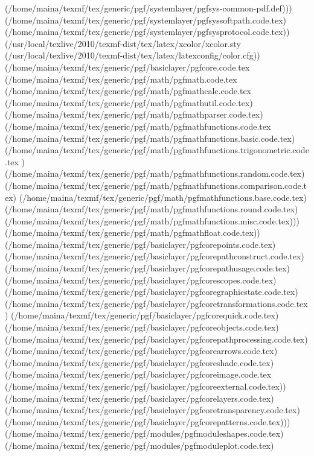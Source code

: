 (/home/maina/texmf/tex/generic/pgf/systemlayer/pgfsys-common-pdf.def)))
(/home/maina/texmf/tex/generic/pgf/systemlayer/pgfsyssoftpath.code.tex)
(/home/maina/texmf/tex/generic/pgf/systemlayer/pgfsysprotocol.code.tex))
(/usr/local/texlive/2010/texmf-dist/tex/latex/xcolor/xcolor.sty
(/usr/local/texlive/2010/texmf-dist/tex/latex/latexconfig/color.cfg))
(/home/maina/texmf/tex/generic/pgf/basiclayer/pgfcore.code.tex
(/home/maina/texmf/tex/generic/pgf/math/pgfmath.code.tex
(/home/maina/texmf/tex/generic/pgf/math/pgfmathcalc.code.tex
(/home/maina/texmf/tex/generic/pgf/math/pgfmathutil.code.tex)
(/home/maina/texmf/tex/generic/pgf/math/pgfmathparser.code.tex)
(/home/maina/texmf/tex/generic/pgf/math/pgfmathfunctions.code.tex
(/home/maina/texmf/tex/generic/pgf/math/pgfmathfunctions.basic.code.tex)
(/home/maina/texmf/tex/generic/pgf/math/pgfmathfunctions.trigonometric.code.tex
) (/home/maina/texmf/tex/generic/pgf/math/pgfmathfunctions.random.code.tex)
(/home/maina/texmf/tex/generic/pgf/math/pgfmathfunctions.comparison.code.tex)
(/home/maina/texmf/tex/generic/pgf/math/pgfmathfunctions.base.code.tex)
(/home/maina/texmf/tex/generic/pgf/math/pgfmathfunctions.round.code.tex)
(/home/maina/texmf/tex/generic/pgf/math/pgfmathfunctions.misc.code.tex)))
(/home/maina/texmf/tex/generic/pgf/math/pgfmathfloat.code.tex))
(/home/maina/texmf/tex/generic/pgf/basiclayer/pgfcorepoints.code.tex)
(/home/maina/texmf/tex/generic/pgf/basiclayer/pgfcorepathconstruct.code.tex)
(/home/maina/texmf/tex/generic/pgf/basiclayer/pgfcorepathusage.code.tex)
(/home/maina/texmf/tex/generic/pgf/basiclayer/pgfcorescopes.code.tex)
(/home/maina/texmf/tex/generic/pgf/basiclayer/pgfcoregraphicstate.code.tex)
(/home/maina/texmf/tex/generic/pgf/basiclayer/pgfcoretransformations.code.tex)
(/home/maina/texmf/tex/generic/pgf/basiclayer/pgfcorequick.code.tex)
(/home/maina/texmf/tex/generic/pgf/basiclayer/pgfcoreobjects.code.tex)
(/home/maina/texmf/tex/generic/pgf/basiclayer/pgfcorepathprocessing.code.tex)
(/home/maina/texmf/tex/generic/pgf/basiclayer/pgfcorearrows.code.tex)
(/home/maina/texmf/tex/generic/pgf/basiclayer/pgfcoreshade.code.tex)
(/home/maina/texmf/tex/generic/pgf/basiclayer/pgfcoreimage.code.tex
(/home/maina/texmf/tex/generic/pgf/basiclayer/pgfcoreexternal.code.tex))
(/home/maina/texmf/tex/generic/pgf/basiclayer/pgfcorelayers.code.tex)
(/home/maina/texmf/tex/generic/pgf/basiclayer/pgfcoretransparency.code.tex)
(/home/maina/texmf/tex/generic/pgf/basiclayer/pgfcorepatterns.code.tex)))
(/home/maina/texmf/tex/generic/pgf/modules/pgfmoduleshapes.code.tex)
(/home/maina/texmf/tex/generic/pgf/modules/pgfmoduleplot.code.tex)
